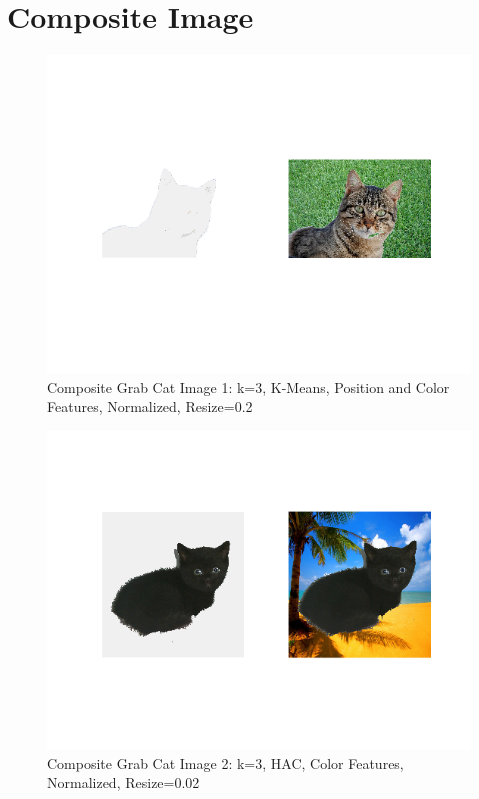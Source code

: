 \documentclass[12pt]{article}
\begin{document}
\section{Composite Image}
\begin{figure}[h!]
	\centering
    \includegraphics[scale=0.45]{grabcat1}
    \caption{Composite Grab Cat Image 1: k=3, K-Means, Position and Color Features, Normalized, Resize=0.2}
\end{figure}

\begin{figure}[h!]
	\centering
    \includegraphics[scale=0.45]{grabcat2}
    \caption{Composite Grab Cat Image 2: k=3, HAC, Color Features, Normalized, Resize=0.02}
\end{figure}
\end{document}
